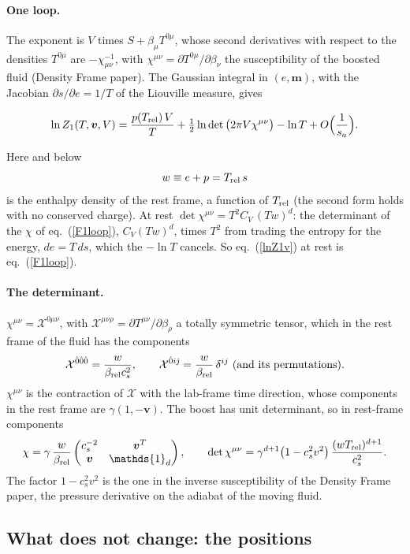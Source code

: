 \documentclass[11pt,aps,preprint,nofootinbib,superscriptaddress,tightenlines]{revtex4-2}
\newcommand{\one}{\mathds{1}}
\def\st{\begin{equation}}
\def\stp{\end{equation}}
\def\Eq#1{eq.~(\ref{#1})}
\let\oldparagraph\paragraph
\renewcommand{\paragraph}{\par\bigskip\oldparagraph}
\begin{document}
\paragraph{One loop.}  The exponent is $V$ times $S+\beta_\mu T^{0\mu}$, whose second derivatives with respect to the densities $T^{0\mu}$ are $-\chi^{-1}_{\mu\nu}$, with
$\chi^{\mu\nu}=\partial T^{0\mu}/\partial\beta_\nu$ the susceptibility of the boosted fluid (Density Frame paper).  The Gaussian integral in $(e,\bm m)$, with the Jacobian
$\partial s/\partial e=1/T$ of the Liouville measure, gives
\begin{keyeq}
\st
\ln Z_1(T,\bm v,V)=\frac{p(T_{\rm rel})\,V}{T}+\tfrac12\ln\det\big(2\pi V\chi^{\mu\nu}\big)-\ln T+O\Big(\frac1{s_a}\Big) .
\label{lnZ1v}
\stp
\end{keyeq}
Here and below
\st
w\equiv e+p=T_{\rm rel}\,s
\stp
is the enthalpy density of the rest frame, a function of $T_{\rm rel}$ (the second form holds with no conserved charge).  At rest $\det\chi^{\mu\nu}=T^2C_V\,(Tw)^d$: the
determinant of the $\chi$ of \Eq{F1loop}, $C_V(Tw)^d$, times $T^2$ from trading the entropy for the energy, $de=T\,ds$, which the $-\ln T$ cancels.  So \Eq{lnZ1v}
at rest is \Eq{F1loop}.

\paragraph{The determinant.}  $\chi^{\mu\nu}=\mathcal X^{0\mu\nu}$, with $\mathcal X^{\mu\nu\rho}=\partial T^{\mu\nu}/\partial\beta_\rho$ a totally symmetric tensor, which in the rest frame of the
fluid has the components
\st
\mathcal X^{\hat0\hat0\hat0}=\frac{w}{\beta_{\rm rel}c_s^2},\qquad \mathcal X^{\hat0\hat\imath\hat\jmath}=\frac w{\beta_{\rm rel}}\,\delta^{ij}\ \text{(and its permutations)} .
\stp
$\chi^{\mu\nu}$ is the contraction of $\mathcal X$ with the lab-frame time direction, whose components in the rest frame are $\gamma(1,-\bm v)$.  The boost has unit
determinant, so in rest-frame components
\st
\chi=\gamma\,\frac w{\beta_{\rm rel}}\begin{pmatrix}c_s^{-2} & \bm v^T\\ \bm v & \one_d\end{pmatrix},\qquad
\det\chi^{\mu\nu}=\gamma^{d+1}\big(1-c_s^2v^2\big)\,\frac{(wT_{\rm rel})^{d+1}}{c_s^2} .
\label{detchiv}
\stp
The factor $1-c_s^2v^2$ is the one in the inverse susceptibility of the Density Frame paper, the pressure derivative on the adiabat of the moving fluid.

\subsection{What does not change: the positions}
\label{sec:motion_positions}
\end{document}
